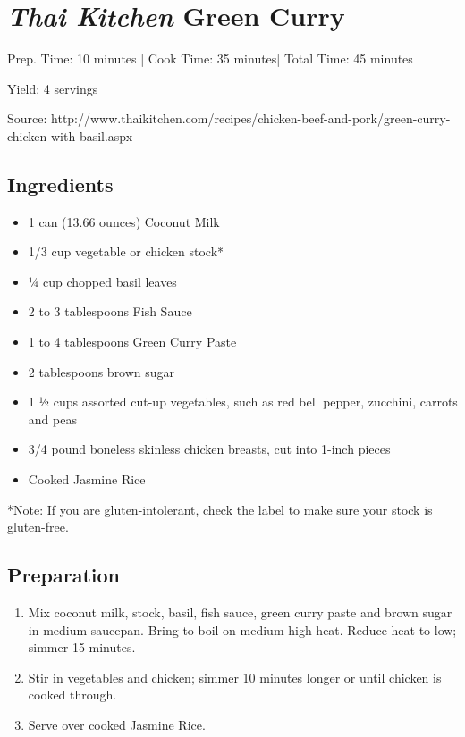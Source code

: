 \section{\emph{Thai Kitchen} Green Curry}

\begin{center}
Prep. Time: 10 minutes |
Cook Time: 35 minutes|
Total Time: 45 minutes
 
Yield: 4 servings

\vspace{1em}

Source: http://www.thaikitchen.com/recipes/chicken-beef-and-pork/green-curry-chicken-with-basil.aspx
\end{center}

\subsection{Ingredients}
\begin{itemize}

    \item 1 can (13.66 ounces)  Coconut Milk
    \item 1/3 cup vegetable or chicken stock*
    \item 1⁄4 cup chopped basil leaves
    \item 2 to 3 tablespoons  Fish Sauce
    \item 1 to 4 tablespoons  Green Curry Paste
    \item 2 tablespoons brown sugar
    \item 1 1⁄2 cups assorted cut-up vegetables, such as red bell pepper, zucchini, carrots and peas
    \item 3/4 pound boneless skinless chicken breasts, cut into 1-inch pieces
    \item Cooked Jasmine Rice

\end{itemize}

*Note: If you are gluten-intolerant, check the label to make sure your stock is gluten-free.

\subsection{Preparation}
\begin{enumerate}
    \item Mix coconut milk, stock, basil, fish sauce, green curry paste and brown sugar in medium saucepan. Bring to boil on medium-high heat. Reduce heat to low; simmer 15 minutes.
    \item Stir in vegetables and chicken; simmer 10 minutes longer or until chicken is cooked through.
    \item Serve over cooked Jasmine Rice.
\end{enumerate}
